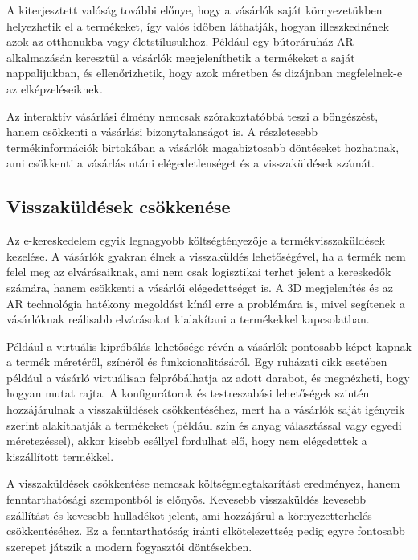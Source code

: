 \documentclass[12pt]{report}
\begin{document}
        A kiterjesztett valóság további előnye, hogy a vásárlók saját környezetükben helyezhetik el a termékeket, így valós időben láthatják, hogyan illeszkednének azok az otthonukba vagy életstílusukhoz. Például egy bútoráruház AR alkalmazásán keresztül a vásárlók megjeleníthetik a termékeket a saját nappalijukban, és ellenőrizhetik, hogy azok méretben és dizájnban megfelelnek-e az elképzeléseiknek.
        
        Az interaktív vásárlási élmény nemcsak szórakoztatóbbá teszi a böngészést, hanem csökkenti a vásárlási bizonytalanságot is. A részletesebb termékinformációk birtokában a vásárlók magabiztosabb döntéseket hozhatnak, ami csökkenti a vásárlás utáni elégedetlenséget és a visszaküldések számát.
        
        \subsection{Visszaküldések csökkenése}

        Az e-kereskedelem egyik legnagyobb költségtényezője a termékvisszaküldések kezelése. A vásárlók gyakran élnek a visszaküldés lehetőségével, ha a termék nem felel meg az elvárásaiknak, ami nem csak logisztikai terhet jelent a kereskedők számára, hanem csökkenti a vásárlói elégedettséget is. A 3D megjelenítés és az AR technológia hatékony megoldást kínál erre a problémára is, mivel segítenek a vásárlóknak reálisabb elvárásokat kialakítani a termékekkel kapcsolatban.

        Például a virtuális kipróbálás lehetősége révén a vásárlók pontosabb képet kapnak a termék méretéről, színéről és funkcionalitásáról. Egy ruházati cikk esetében például a vásárló virtuálisan felpróbálhatja az adott darabot, és megnézheti, hogy hogyan mutat rajta. A konfigurátorok és testreszabási lehetőségek szintén hozzájárulnak a visszaküldések csökkentéséhez, mert ha a vásárlók saját igényeik szerint alakíthatják a termékeket (például szín és anyag választással vagy egyedi méretezéssel), akkor kisebb eséllyel fordulhat elő, hogy nem elégedettek a kiszállított termékkel.
        
        A visszaküldések csökkentése nemcsak költségmegtakarítást eredményez, hanem fenntarthatósági szempontból is előnyös. Kevesebb visszaküldés kevesebb szállítást és kevesebb hulladékot jelent, ami hozzájárul a környezetterhelés csökkentéséhez. Ez a fenntarthatóság iránti elkötelezettség pedig egyre fontosabb szerepet játszik a modern fogyasztói döntésekben.
\end{document}
